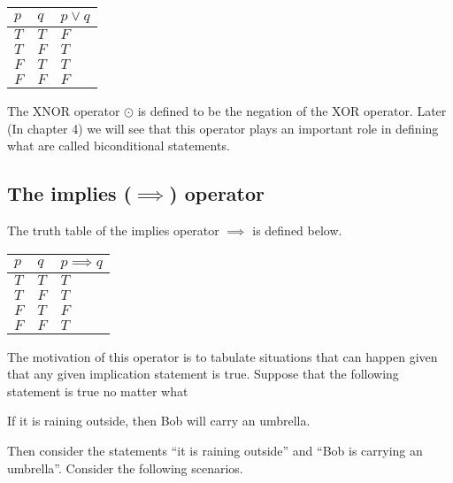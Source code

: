 \begin{table}[h]
\centering
\begin{tabular}{|l|l|l|}
\hline 
$p$ & $q$ & $p \lor q$ \\ \hline
$T$ & $T$ & $F$ \\ \hline
$T$ & $F$ & $T$ \\ \hline
$F$ & $T$ & $T$ \\ \hline
$F$ & $F$ & $F$ \\ \hline
\end{tabular}
\end{table}

The XNOR operator $\odot$ is defined to be the negation of the XOR operator. Later (In chapter 4) we will see that this operator plays an important role in defining what are called biconditional statements.

\subsection{The implies ($\implies$) operator}

The truth table of the implies operator $\implies$ is defined below. 

\begin{table}[h]
\centering
\begin{tabular}{|l|l|l|}
\hline 
$p$ & $q$ & $p \implies q$ \\ \hline
$T$ & $T$ & $T$ \\ \hline
$T$ & $F$ & $T$ \\ \hline
$F$ & $T$ & $F$ \\ \hline
$F$ & $F$ & $T$ \\ \hline
\end{tabular}
\end{table}

The motivation of this operator is to tabulate situations that can happen given that any given implication statement is true. Suppose that the following statement is true no matter what

\begin{center}
If it is raining outside, then Bob will carry an umbrella.
\end{center}

Then consider the statements ``it is raining outside'' and ``Bob is carrying an umbrella''. Consider the following scenarios.

